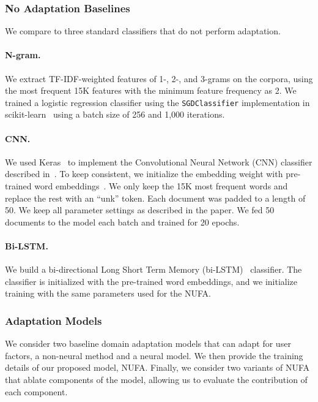\subsubsection{No Adaptation Baselines}
We compare to three standard classifiers that do not perform adaptation.


\paragraph{N-gram.} We extract TF-IDF-weighted features of 1-, 2-, and 3-grams on the corpora, using the most frequent 15K features with the minimum feature frequency as 2.
We trained a logistic regression classifier using the \texttt{SGDClassifier} implementation in scikit-learn~\cite{pedregosa2011scikit}
using a batch size of 256 and 1,000 iterations. 

\paragraph{CNN.} We used Keras~\cite{chollet2015keras} to implement the Convolutional Neural Network (CNN) classifier described in~\cite{kim2014convolutional}. To keep consistent, we initialize the embedding weight with pre-trained word embeddings~\cite{mikolov2013distributed,pennington2014glove}. We only keep the 15K most frequent words and replace the rest with an ``unk'' token. Each document was padded to a length of 50. We keep all parameter settings as described in the paper. We fed 50 documents to the model each batch and trained for 20 epochs.

\paragraph{Bi-LSTM.} We build a bi-directional Long Short Term Memory (bi-LSTM)~\cite{hochreiter1997long} classifier. The classifier is initialized with the pre-trained word embeddings, and we initialize training with the same parameters used for the NUFA.



\subsubsection{Adaptation Models}

We consider two baseline domain adaptation models that can adapt for user factors, a non-neural method and a neural model.
We then provide the training details of our proposed model, NUFA.
Finally, we consider two variants of NUFA that ablate components of the model, allowing us to evaluate the contribution of each component.

